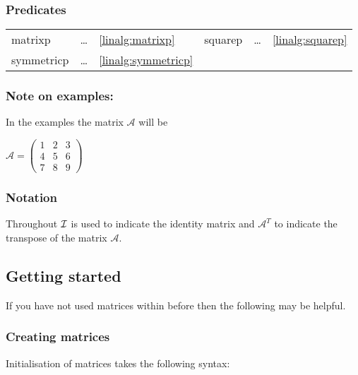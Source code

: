 \subsubsection{Predicates}

\begin{center}
  \begin{tabular}{l l l l l l}
    matrixp     & \ldots &\ref{linalg:matrixp} & 
    squarep     & \ldots &\ref{linalg:squarep} \\
    symmetricp  & \ldots &\ref{linalg:symmetricp} & 
  \end{tabular}
\end{center}


\subsubsection*{Note on examples:} 

In the examples the matrix $\mathcal{A}$ will be 

\begin{flushleft}
\begin{math}
\mathcal{A} = \left( \begin{array}{ccc} 1 & 2 & 3 \\ 4 & 5 & 6 \\ 7 & 8 & 9
\end{array} \right)
\end{math}
\end{flushleft}


\subsubsection*{Notation}

Throughout ${\cal I}$ is used to indicate the identity matrix and 
$\mathcal{A}^T$ to indicate the transpose of the matrix $\mathcal{A}$.

\subsection{Getting started}

If you have not used matrices within {\REDUCE} before then the following may be
helpful.

\subsubsection*{Creating matrices}

Initialisation of matrices takes the following syntax:

